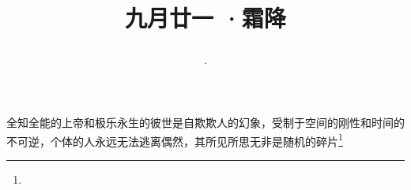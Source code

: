 \title{\date[d=23,m=10,y=2024][year:cn-y,年,month:cn,day:cn,日,·,weekday]·九月廿一 ·霜降}
全知全能的上帝和极乐永生的彼世是自欺欺人的幻象，受制于空间的刚性和时间的不可逆，个体的人永远无法逃离偶然，其所见所思无非是随机的碎片\footnote{ }


